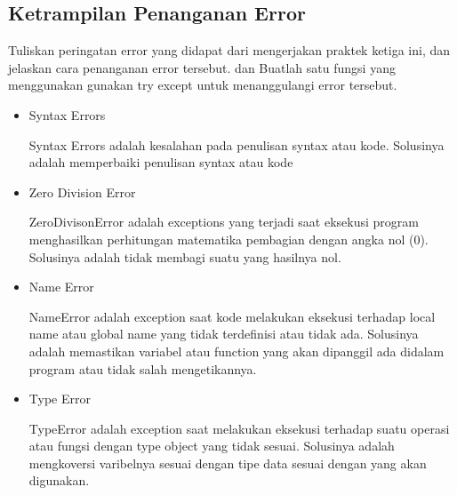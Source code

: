 \subsection{Ketrampilan Penanganan Error}
Tuliskan peringatan error yang didapat dari mengerjakan praktek ketiga ini, dan jelaskan cara penanganan error tersebut. dan Buatlah satu fungsi yang menggunakan gunakan try except untuk menanggulangi error tersebut.
\begin{itemize}
\item Syntax Errors

Syntax Errors adalah kesalahan pada penulisan syntax atau kode. Solusinya adalah memperbaiki penulisan syntax atau kode

\item Zero Division Error

ZeroDivisonError adalah exceptions yang terjadi saat eksekusi program menghasilkan perhitungan matematika pembagian dengan angka nol (0). Solusinya adalah tidak membagi suatu yang hasilnya nol.

\item Name Error

NameError adalah exception saat kode melakukan eksekusi terhadap local name atau global name yang tidak terdefinisi atau tidak ada. Solusinya adalah memastikan variabel atau function yang akan dipanggil ada didalam program atau tidak salah mengetikannya.

\item Type Error

TypeError adalah exception saat melakukan eksekusi terhadap suatu operasi atau fungsi dengan type object yang tidak sesuai. Solusinya adalah mengkoversi varibelnya sesuai dengan tipe data sesuai dengan yang akan digunakan.

\end{itemize}
